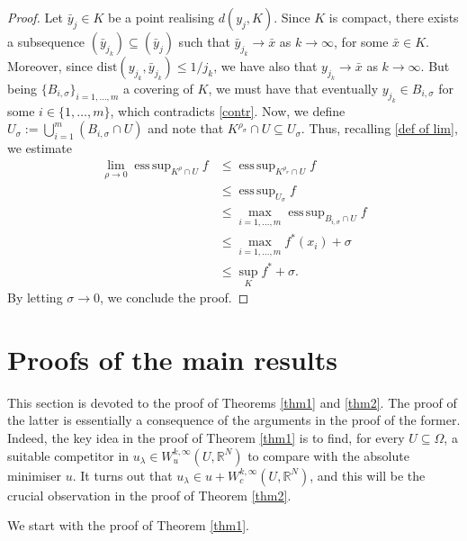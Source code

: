 \documentclass[a4paper,11pt]{article}
\numberwithin{equation}{section}
\newcommand{\numberset}{\mathbb}
\newcommand{\Om}{\Omega}
\newcommand{\R}{\numberset{R}}
\DeclareMathOperator*{\esssup}{ess\,sup}
\theoremstyle{definition}
\begin{document}
\begin{proof}
 Let $\bar y_j\in K$ be a point realising $d(y_j,K)$. Since $K$ is compact, there exists a subsequence $(\bar y_{j_k})\subseteq(\bar y_j)$ such that $\bar y_{j_k}\longrightarrow  \bar x$ as $k\to  \infty$, for some $\bar x\in K$. Moreover, since $\mathrm{dist}(y_{j_k},\bar y_{j_k})\leq1/{j_k}$, we have also that $y_{j_k}\longrightarrow  \bar x$ as $k\to  \infty$. But being $\{B_{i,\sigma}\}_{i=1,\ldots,m}$ a covering of $K$, we must have that eventually $y_{j_k}\in B_{i,\sigma}$ for some $i\in\{1,\ldots,m\}$, which contradicts \eqref{contr}. Now, we define $U_\sigma:=\bigcup_{i=1}^m (B_{i,\sigma}\cap U)$ and note that ${K^{\rho_\sigma}\cap U}\subseteq U_\sigma$. Thus, recalling \eqref{def of lim}, we estimate
\begin{align*}
\lim_{\rho\to  0}\esssup_{K^\rho\cap U}f&\leq\esssup_{K^{\rho_\sigma}\cap U}f\\
&\leq \esssup_{U_\sigma}f\\
&\leq\max_{i=1,\ldots,m}\esssup_{B_{i,\sigma}\cap U}f\\
&\leq\max_{i=1,\ldots,m} f^*(x_i)+\sigma\\
&\leq\sup_K f^*+\sigma.
\end{align*}
By letting $\sigma\to 0$, we conclude the proof.
\end{proof}













\section{Proofs of the main results}\label{sec:proofs}

This section is devoted to the proof of Theorems \ref{thm1} and \ref{thm2}. The proof of the latter is essentially a consequence of the arguments in the proof of the former. Indeed, the key idea in the proof of Theorem \ref{thm1} is to find, for every $U\subseteq\Om$, a suitable competitor in $u_\lambda\in W^{k,\infty}_u(U,\R^N)$ to compare with the absolute minimiser $u$. It turns out that $u_\lambda\in u+W^{k,\infty}_c(U,\R^N)$, and this will be the crucial observation in the proof of Theorem \ref{thm2}.

We start with the proof of Theorem \ref{thm1}.

\medskip
\end{document}
